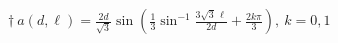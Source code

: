\documentclass{article}
\begin{document}
\section*{}
\begin{center}
\noindent{}
\Large{
$\dagger\ a(d,\ell) =\frac{2d}{\sqrt{3}} \sin
  \left(
    \frac{1}{3} \sin^{-1} \frac{3\sqrt{3}\, \ell}{2d}+\frac{2k\pi}{3}
  \right),\ k=0,1$}
\newpage


\end{center}
\end{document}
